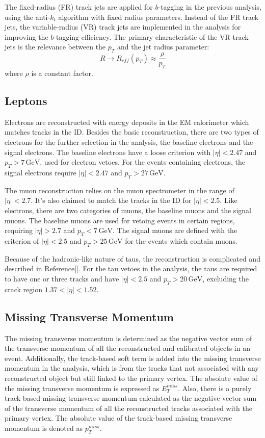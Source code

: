 \documentclass[class=NTHU_thesis, crop=false]{standalone}
\begin{document}
The fixed-radius (FR) track jets are applied for $b$-tagging in the previous analysis, using the anti-$k_t$ algorithm with fixed radius parameters. Instead of the FR track jets, the variable-radius (VR) track jets are implemented in the analysis for improving the $b$-tagging efficiency. The primary characteristic of the VR track jets is the relevance between the $p_T$ and the jet radius parameter: 
\begin{equation}
R \to R_{eff}(p_T) \approx \frac{\rho}{p_T}
\end{equation}
where $\rho$ is a constant factor.

\subsection{Leptons}
Electrons are reconstructed with energy deposits in the EM calorimeter which matches tracks in the ID. Besides the basic reconstruction, there are two types of electrons for the further selection in the analysis, the baseline electrons and the signal electrons. The baseline electrons have a loose criterion with $\left|\eta\right| < 2.47$ and $p_T > 7\, \mathrm{GeV}$, used for electron vetoes. For the events containing electrons, the signal electrons require $\left|\eta\right| < 2.47$ and $p_T > 27\, \mathrm{GeV}$.

The muon reconstruction relies on the muon spectrometer in the range of $\left|\eta\right| < 2.7$. It's also claimed to match the tracks in the ID for $\left|\eta\right| < 2.5$. Like electrons, there are two categories of muons, the baseline muons and the signal muons. The baseline muons are used for vetoing events in certain regions, requiring $\left|\eta\right| > 2.7$ and $p_T < 7\, \mathrm{GeV}$. The signal muons are defined with the criterion of $\left|\eta\right| < 2.5$ and $p_T > 25\, \mathrm{GeV}$ for the events which contain muons.

Because of the hadronic-like nature of taus, the reconstruction is complicated and described in Reference[]. For the tau vetoes in the analysis, the taus are required to have one or three tracks and have $\left|\eta\right| < 2.5$ and $p_T > 20\, \mathrm{GeV}$, excluding the crack region $1.37 < \left|\eta\right| < 1.52$.

\subsection{Missing Transverse Momentum}
The missing transverse momentum is determined as the negative vector sum of the transverse momentum of all the reconstructed and calibrated objects in an event. Additionally, the track-based soft term is added into the missing transverse momentum in the analysis, which is from the tracks that not associated with any reconstructed object but still linked to the primary vertex. The absolute value of the missing transverse momentum is expressed as $E^{miss}_T$. Also, there is a purely track-based missing transverse momentum calculated as the negative vector sum of the transverse momentum of all the reconstructed tracks associated with the primary vertex. The absolute value of the track-based missing transverse momentum is denoted as $p^{miss}_T$.
\end{document}
